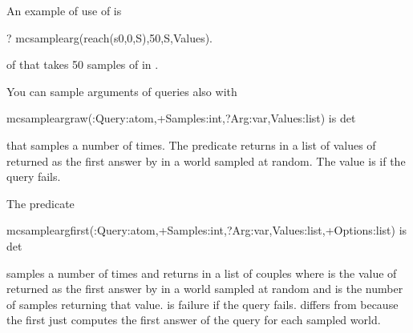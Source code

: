 \documentclass[letterpaper,10pt,english]{sphinxmanual}
\begin{document}
An example of use of  is

\begin{sphinxVerbatim}[commandchars=\\\{\}]
?\PYGZhy{} mc\PYGZus{}sample\PYGZus{}arg(reach(s0,0,S),50,S,Values).
\end{sphinxVerbatim}

of  that takes 50 samples of  in .

You can sample arguments of queries also with

\begin{sphinxVerbatim}[commandchars=\\\{\}]
mc\PYGZus{}sample\PYGZus{}arg\PYGZus{}raw(:Query:atom,+Samples:int,?Arg:var,\PYGZhy{}Values:list) is det
\end{sphinxVerbatim}

that samples  a number of  times. The predicate returns in  a list of values of  returned as the first answer by  in a world sampled at random.
The value is  if the query fails.

The predicate

\begin{sphinxVerbatim}[commandchars=\\\{\}]
mc\PYGZus{}sample\PYGZus{}arg\PYGZus{}first(:Query:atom,+Samples:int,?Arg:var,\PYGZhy{}Values:list,+Options:list) is det
\end{sphinxVerbatim}

samples  a number of  times and returns in  a list of couples  where  is the value of  returned as the first answer by  in a world sampled at random and  is the number of samples returning that value.  is failure if the query fails.  differs from  because the first just computes the first answer of the query for each sampled world.
\end{document}
